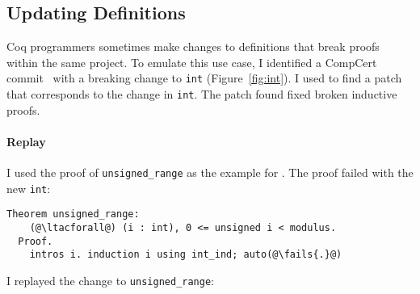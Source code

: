 
\begin{figure*}
\begin{minipage}{0.49\textwidth}
\lstset{language=coq, aboveskip=0pt,belowskip=0pt}



\end{minipage}
\hfill
\begin{minipage}{0.49\textwidth}
\lstset{language=coq, aboveskip=0pt,belowskip=0pt}



\end{minipage}
\caption[Caption for LOF]{Old (left) and new (right) definitions of \lstinline{int} in CompCert.}
\label{fig:int}
\end{figure*}

\subsection{Updating Definitions}
\label{sec:compcert}

Coq programmers sometimes make changes to definitions that break proofs
within the same project. To emulate this use case, 
I identified a CompCert commit~\cite{compcertcommit}
with a breaking change to \lstinline{int} (Figure~\ref{fig:int}). %
I used \sysname to find a patch that corresponds to the change in \lstinline{int}.
The patch \sysname found fixed broken inductive proofs.

\paragraph{Replay} I used the proof of \lstinline{unsigned_range} as the example for \sysname.
The proof failed with the new \lstinline{int}:

\lstset{language=coq, aboveskip=3pt,belowskip=3pt}
\begin{lstlisting}[language=coq]
  Theorem unsigned_range:
    (@\ltacforall@) (i : int), 0 <= unsigned i < modulus.
  Proof.
    intros i. induction i using int_ind; auto(@\fails{.}@)
\end{lstlisting}
I replayed the change to \lstinline{unsigned_range}:

